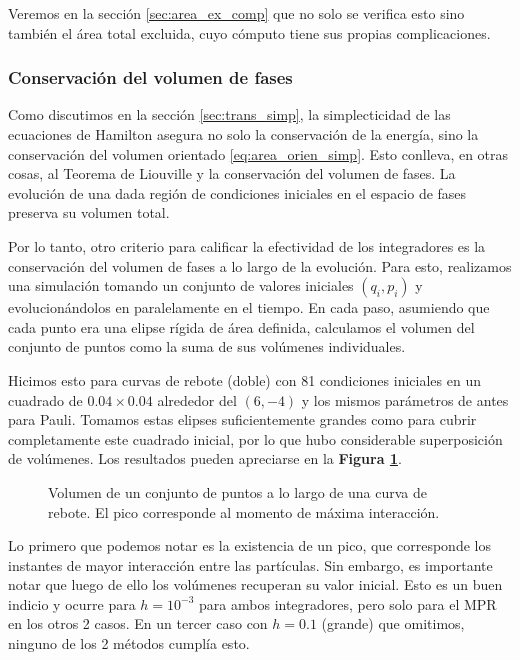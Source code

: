 Veremos en la sección \ref{sec:area_ex_comp} que no solo se verifica esto sino también el área total excluida, cuyo cómputo tiene sus propias complicaciones.


\subsubsection{Conservación del volumen de fases}

Como discutimos en la sección \ref{sec:trans_simp}, la simplecticidad de las ecuaciones de Hamilton asegura no solo la conservación de la energía, sino la conservación del volumen orientado \eqref{eq:area_orien_simp}.
Esto conlleva, en otras cosas, al Teorema de Liouville y la conservación del volumen de fases.
La evolución de una dada región de condiciones iniciales en el espacio de fases preserva su volumen total.

Por lo tanto, otro criterio para calificar la efectividad de los integradores es la conservación del volumen de fases a lo largo de la evolución.
Para esto, realizamos una simulación tomando un conjunto de valores iniciales $(q_i, p_i)$ y evolucionándolos en paralelamente en el tiempo.
En cada paso, asumiendo que cada punto era una elipse rígida de área definida, calculamos el volumen del conjunto de puntos como la suma de sus volúmenes individuales.

Hicimos esto para curvas de rebote (doble) con 81 condiciones iniciales en un cuadrado de $0.04\times0.04$ alrededor del $(6, -4)$ y los mismos parámetros de antes para Pauli.
Tomamos estas elipses suficientemente grandes como para cubrir completamente este cuadrado inicial, por lo que hubo considerable superposición de volúmenes.
Los resultados pueden apreciarse en la \textbf{Figura \ref{fig:vol_fas}}.

\begin{figure}[h]
	\centering
	\caption{Volumen de un conjunto de puntos a lo largo de una curva de rebote. El pico corresponde al momento de máxima interacción.}
	\label{fig:vol_fas}
\end{figure}

Lo primero que podemos notar es la existencia de un pico, que corresponde los instantes de mayor interacción entre las partículas.
Sin embargo, es importante notar que luego de ello los volúmenes recuperan su valor inicial.
Esto es un buen indicio y ocurre para $h=10^{-3}$ para ambos integradores, pero solo para el MPR en los otros 2 casos.
En un tercer caso con $h=0.1$ (grande) que omitimos, ninguno de los 2 métodos cumplía esto.

